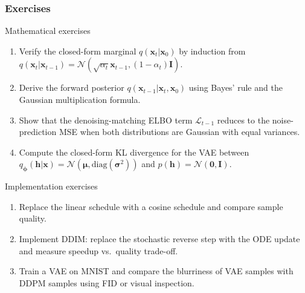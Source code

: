 \documentclass{beamer}
\newcommand{\Norm}{\mathcal{N}}
\begin{document}
\begin{frame}
\frametitle{Exercises}

\begin{block}{Mathematical exercises}
\begin{enumerate}
  \item Verify the closed-form marginal $q(\bm{x}_t|\bm{x}_0)$
        by induction from $q(\bm{x}_t|\bm{x}_{t-1})=\Norm(\sqrt{\alpha_t}\bm{x}_{t-1},(1-\alpha_t)\mathbf{I})$.
  \item Derive the forward posterior $q(\bm{x}_{t-1}|\bm{x}_t,\bm{x}_0)$
        using Bayes' rule and the Gaussian multiplication formula.
  \item Show that the denoising-matching ELBO term $\mathcal{L}_{t-1}$ reduces
        to the noise-prediction MSE when both distributions are Gaussian with
        equal variances.
  \item Compute the closed-form KL divergence for the VAE between
        $q_{\bm{\phi}}(\bm{h}|\bm{x})=\Norm(\bm{\mu},\mathrm{diag}(\bm{\sigma}^2))$
        and $p(\bm{h})=\Norm(\bm{0},\mathbf{I})$.
\end{enumerate}
\end{block}

\begin{block}{Implementation exercises}
\begin{enumerate}
  \item Replace the linear schedule with a cosine schedule and compare sample quality.
  \item Implement DDIM: replace the stochastic reverse step with the ODE update
        and measure speedup vs.\ quality trade-off.
  \item Train a VAE on MNIST and compare the blurriness of VAE samples with DDPM samples
        using FID or visual inspection.
\end{enumerate}
\end{block}
\end{frame}
\end{document}
